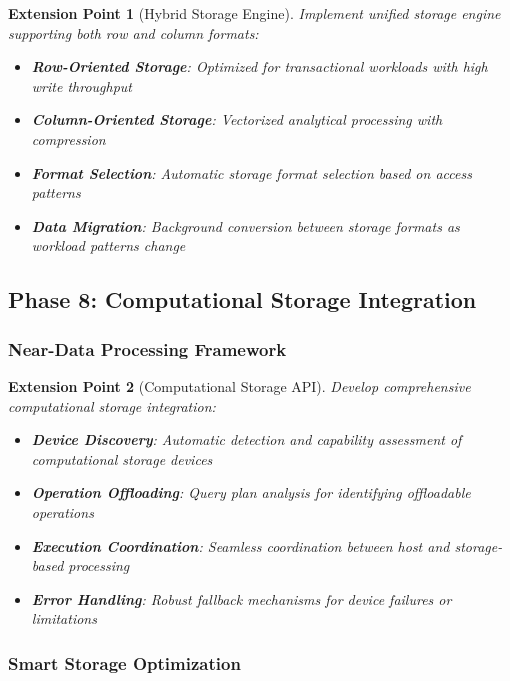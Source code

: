 \documentclass[12pt,a4paper]{article}
\newtheorem{extension}{Extension Point}[section]
\begin{document}
    \begin{extension}[Hybrid Storage Engine]
        Implement unified storage engine supporting both row and column formats:

        \begin{itemize}
            \item \textbf{Row-Oriented Storage}: Optimized for transactional workloads with high write throughput
            \item \textbf{Column-Oriented Storage}: Vectorized analytical processing with compression
            \item \textbf{Format Selection}: Automatic storage format selection based on access patterns
            \item \textbf{Data Migration}: Background conversion between storage formats as workload patterns change
        \end{itemize}
    \end{extension}

    \subsection{Phase 8: Computational Storage Integration}

    \subsubsection{Near-Data Processing Framework}

    \begin{extension}[Computational Storage API]
        Develop comprehensive computational storage integration:

        \begin{itemize}
            \item \textbf{Device Discovery}: Automatic detection and capability assessment of computational storage devices
            \item \textbf{Operation Offloading}: Query plan analysis for identifying offloadable operations
            \item \textbf{Execution Coordination}: Seamless coordination between host and storage-based processing
            \item \textbf{Error Handling}: Robust fallback mechanisms for device failures or limitations
        \end{itemize}
    \end{extension}

    \subsubsection{Smart Storage Optimization}
\end{document}
